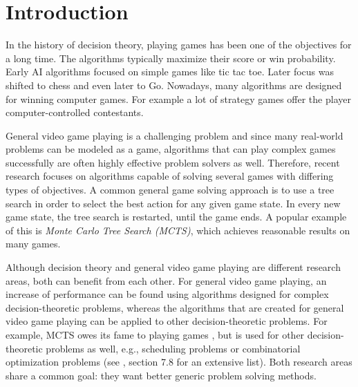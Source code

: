 \chapter{Introduction}
\label{sec:introduction}






In the history of decision theory, playing games has been one of the objectives
for a long time. The algorithms typically maximize their score or win
probability. Early AI algorithms focused on simple games like tic tac toe.
Later focus was shifted to chess and even later to Go. Nowadays, many algorithms
are designed for winning computer games. For example a lot of strategy games
offer the player computer-controlled contestants. 

General video game playing is a challenging problem and since many real-world
problems can be modeled as a game, algorithms that can play complex games
successfully are often highly effective problem solvers as well.
Therefore, recent research focuses on algorithms capable of solving several
games with differing types of objectives. A common general game solving
approach is to use a tree search in order to select the best action for any
given game state. In every new game state, the tree search is restarted, until
the game ends. A popular example of this is \emph{Monte Carlo Tree Search
(MCTS)}, which achieves reasonable results on many games.

Although decision theory and general video game playing are different research
areas, both can benefit from each other. For general video game playing, an
increase of performance can be found using algorithms designed for complex
decision-theoretic problems, whereas the algorithms that are created for general
video game playing can be applied to other decision-theoretic problems. For
example, MCTS owes its fame to playing games \cite{gelly2006modification}, but
is used for other decision-theoretic problems as well, e.g., scheduling problems
or combinatorial optimization problems (see \cite{browne2012survey}, section 7.8
for an extensive list). Both research areas share a common goal: they want
better generic problem solving methods.

